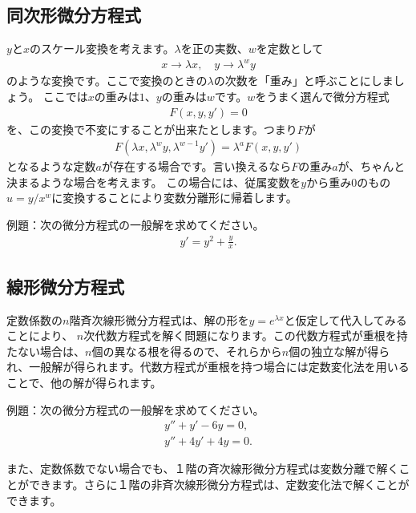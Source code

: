 \documentclass[report,paper=a4, fontsize=12pt, line_length=16cm, number_of_lines=33,dvipdfmx]{jlreq}
\numberwithin{equation}{section}
\begin{document}
\subsection{同次形微分方程式}
$y$と$x$のスケール変換を考えます。$\lambda$を正の実数、$w$を定数として
\begin{align}
  x\to \lambda x,\quad y \to \lambda^wy 
\end{align}
のような変換です。ここで変換のときの$\lambda$の次数を「重み」と呼ぶことにしましょう。
ここでは$x$の重みは$1$、$y$の重みは$w$です。$w$をうまく選んで微分方程式
\begin{align}
  F(x,y,y')=0
\end{align}
を、この変換で不変にすることが出来たとします。つまり$F$が
\begin{align}
  F(\lambda x, \lambda^w y, \lambda^{w-1}y')=\lambda^{a}F(x,y,y')
\end{align}
となるような定数$a$が存在する場合です。言い換えるなら$F$の重み$a$が、ちゃんと決まるような場合を考えます。
この場合には、従属変数を$y$から重み$0$のもの$u=y/x^{w}$に変換することにより変数分離形に帰着します。

例題：次の微分方程式の一般解を求めてください。
\begin{align}
  y'=y^2+\frac{y}{x}.
\end{align}

\subsection{線形微分方程式}\label{elementarylinear}
定数係数の$n$階斉次線形微分方程式は、解の形を$y=e^{\lambda x}$と仮定して代入してみることにより、
$n$次代数方程式を解く問題になります。この代数方程式が重根を持たない場合は、$n$個の異なる根を得るので、それらから$n$個の独立な解が得られ、一般解が得られます。代数方程式が重根を持つ場合には定数変化法を用いることで、他の解が得られます。

例題：次の微分方程式の一般解を求めてください。
\begin{align}
  y''+y'-6y=0,\\
  y''+4y'+4y=0.
\end{align}

また、定数係数でない場合でも、１階の斉次線形微分方程式は変数分離で解くことができます。さらに１階の非斉次線形微分方程式は、定数変化法で解くことができます。
\end{document}

